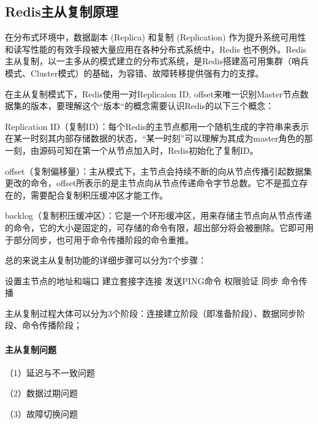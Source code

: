\documentclass[../../../interview-questions.tex]{subfiles}
\begin{document}
\subsection{Redis主从复制原理}

在分布式环境中，数据副本 (Replica) 和复制 (Replication) 作为提升系统可用性和读写性能的有效手段被大量应用在各种分布式系统中，Redis 也不例外。Redis主从复制，以一主多从的模式建立的分布式系统，是Redis搭建高可用集群（哨兵模式、Cluster模式）的基础，为容错、故障转移提供强有力的支撑。

在主从复制模式下，Redis使用一对Replicaion ID, offset来唯一识别Master节点数据集的版本，要理解这个“版本“的概念需要认识Redis的以下三个概念：

Replication ID（复制ID）：每个Redis的主节点都用一个随机生成的字符串来表示在某一时刻其内部存储数据的状态，“某一时刻”可以理解为其成为master角色的那一刻，由源码可知在第一个从节点加入时，Redis初始化了复制ID。

offset（复制偏移量）：主从模式下，主节点会持续不断的向从节点传播引起数据集更改的命令，offset所表示的是主节点向从节点传递命令字节总数。它不是孤立存在的，需要配合复制积压缓冲区才能工作。

backlog（复制积压缓冲区）：它是一个环形缓冲区，用来存储主节点向从节点传递的命令，它的大小是固定的，可存储的命令有限，超出部分将会被删除。它即可用于部分同步，也可用于命令传播阶段的命令重推。



总的来说主从复制功能的详细步骤可以分为7个步骤：

设置主节点的地址和端口
建立套接字连接
发送PING命令
权限验证
同步
命令传播

主从复制过程大体可以分为3个阶段：连接建立阶段（即准备阶段）、数据同步阶段、命令传播阶段；

\paragraph{主从复制问题}

（1）延迟与不一致问题

（2）数据过期问题

（3）故障切换问题
\end{document}

